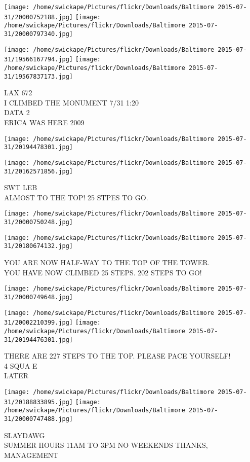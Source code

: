 \documentclass[10pt,letterpaper]{article}
\begin{document}
\texttt{[image: /home/swickape/Pictures/flickr/Downloads/Baltimore 2015-07-31/20000752188.jpg]}
\texttt{[image: /home/swickape/Pictures/flickr/Downloads/Baltimore 2015-07-31/20000797340.jpg]}

\texttt{[image: /home/swickape/Pictures/flickr/Downloads/Baltimore 2015-07-31/19566167794.jpg]}
\texttt{[image: /home/swickape/Pictures/flickr/Downloads/Baltimore 2015-07-31/19567837173.jpg]}

LAX 672\\
I CLIMBED THE MONUMENT 7/31 1:20\\
DATA 2\\
ERICA WAS HERE 2009\\
\pagebreak

\texttt{[image: /home/swickape/Pictures/flickr/Downloads/Baltimore 2015-07-31/20194478301.jpg]}

\vspace{0.25in}
\texttt{[image: /home/swickape/Pictures/flickr/Downloads/Baltimore 2015-07-31/20162571856.jpg]}

SWT LEB\\
ALMOST TO THE TOP!  25 STPES TO GO.\\
\pagebreak

\texttt{[image: /home/swickape/Pictures/flickr/Downloads/Baltimore 2015-07-31/20000750248.jpg]}

\vspace{0.25in}
\texttt{[image: /home/swickape/Pictures/flickr/Downloads/Baltimore 2015-07-31/20180674132.jpg]}

YOU ARE NOW HALF{-}WAY TO THE TOP OF THE TOWER.\\
YOU HAVE NOW CLIMBED 25 STEPS.  202 STEPS TO GO!\\
\pagebreak

\texttt{[image: /home/swickape/Pictures/flickr/Downloads/Baltimore 2015-07-31/20000749648.jpg]}

\vspace{0.25in}
\texttt{[image: /home/swickape/Pictures/flickr/Downloads/Baltimore 2015-07-31/20002210399.jpg]}
\texttt{[image: /home/swickape/Pictures/flickr/Downloads/Baltimore 2015-07-31/20194476301.jpg]}

THERE ARE 227 STEPS TO THE TOP.  PLEASE PACE YOURSELF!\\
4 SQUA E\\
LATER\\
\pagebreak

\texttt{[image: /home/swickape/Pictures/flickr/Downloads/Baltimore 2015-07-31/20188833895.jpg]}
\texttt{[image: /home/swickape/Pictures/flickr/Downloads/Baltimore 2015-07-31/20000747488.jpg]}

SLAYDAWG\\
SUMMER HOURS 11AM TO 3PM NO WEEKENDS THANKS, MANAGEMENT\\
\pagebreak
\end{document}
